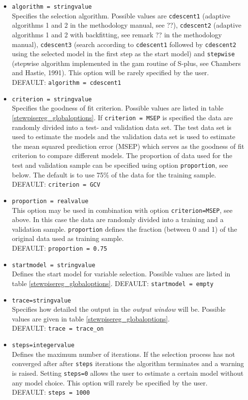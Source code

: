 \begin{itemize}
\item {\tt algorithm = stringvalue} \\
Specifies the selection algorithm. Possible values are {\tt cdescent1} (adaptive algorithms 1 and 2 in the methodology manual, see ??),
{\tt cdescent2} (adaptive algorithms  1 and 2 with backfitting, see remark ?? in the methodology manual), {\tt cdescent3} (search according to
{\tt cdescent1}  followed by {\tt cdescent2}  using the selected model in the first step as the start model) and {\tt stepwise}
(stepwise algorithm implemented in the gam routine of S-plus, see Chambers and Hastie, 1991).
This option will be rarely specified by the user. \\
DEFAULT: {\tt algorithm = cdescent1}
\item {\tt criterion = stringvalue} \\
Specifies the goodness of  fit criterion. Possible values are listed in table \ref{stewpisereg_globaloptions}. If {\tt criterion = MSEP} is specified
the data are randomly divided into a test- and validation data set. The test data set is used to estimate the models and the validation data set is used to
estimate the mean squared prediction error (MSEP) which serves as the goodness of fit criterion to compare different models. The proportion of data used for
the test and validation sample can be specified using option {\tt proportion}, see below. The default is to use 75\% of the data for the training sample. \\
DEFAULT: {\tt criterion = GCV}
\item {\tt proportion = realvalue} \\
This option may be used in combination with option {\tt criterion=MSEP}, see above. In this case the data are randomly divided into
a training and a validation sample. {\tt proportion} defines the fraction (between 0 and 1)  of the original data used as training sample. \\
DEFAULT: {\tt proportion = 0.75}
\item {\tt startmodel = stringvalue} \\
Defines the start model for variable selection. Possible values are listed in table \ref{stewpisereg_globaloptions}.
DEFAULT: {\tt startmodel = empty}
\item {\tt trace=stringvalue} \\
Specifies how detailed the output in the {\it output window} will be. Possible values are given in table \ref{stewpisereg_globaloptions}. \\
DEFAULT: {\tt trace = trace\_on}
\item {\tt steps=integervalue}   \\
Defines the maximum number of iterations.  If the selection process  has not converged after after {\tt steps} iterations the algorithm terminates and a warning is
raised. Setting {\tt steps=0} allows the user to estimate a certain model without any model choice. This option will rarely be specified by the user.\\
DEFAULT: {\tt steps = 1000}
\end{itemize}


